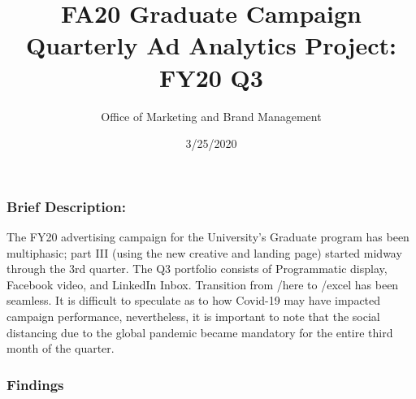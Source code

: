 \documentclass[
  11pt,
]{article}
\title{FA20 Graduate Campaign Quarterly Ad Analytics Project: FY20 Q3}
\author{Office of Marketing and Brand Management}
\date{3/25/2020}
\begin{document}
\maketitle

\hypertarget{brief-description}{%
\subsubsection{Brief Description:}\label{brief-description}}

The FY20 advertising campaign for the University's Graduate program has
been multiphasic; part III (using the new creative and landing page)
started midway through the 3rd quarter. The Q3 portfolio consists of
Programmatic display, Facebook video, and LinkedIn Inbox. Transition
from /here to /excel has been seamless. It is difficult to speculate as
to how Covid-19 may have impacted campaign performance, nevertheless, it
is important to note that the social distancing due to the global
pandemic became mandatory for the entire third month of the quarter.

\hypertarget{findings}{%
\subsubsection{Findings}\label{findings}}
\end{document}
